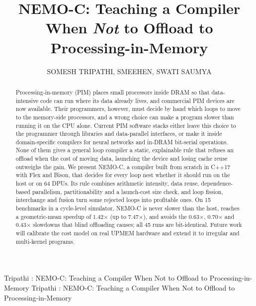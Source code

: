 \documentclass{ieeeaccess}
\begin{document}

\title{NEMO-C: Teaching a Compiler When \emph{Not} to Offload to Processing-in-Memory}

\author{\uppercase{Somesh Tripathi},
\uppercase{Smeehen},
\uppercase{Swati Saumya}}

\address[1]{School of Computer Science and Engineering, Vellore Institute of Technology, Vellore, Tamil Nadu 632014, India (Reg. Nos. 24BCE0533, 24BCE0502, 24BCE0253)}


\markboth
{Tripathi \headeretal: NEMO-C: Teaching a Compiler When Not to Offload to Processing-in-Memory}
{Tripathi \headeretal: NEMO-C: Teaching a Compiler When Not to Offload to Processing-in-Memory}


\begin{abstract}
Processing-in-memory (PIM) places small processors inside DRAM so that data-intensive code can run where its data already lives, and commercial PIM devices are now available. Their programmers, however, must decide by hand which loops to move to the memory-side processors, and a wrong choice can make a program slower than running it on the CPU alone. Current PIM software stacks either leave this choice to the programmer through libraries and data-parallel interfaces, or make it inside domain-specific compilers for neural networks and in-DRAM bit-serial operations. None of them gives a general loop compiler a static, explainable rule that refuses an offload when the cost of moving data, launching the device and losing cache reuse outweighs the gain. We present NEMO-C, a compiler built from scratch in C++17 with Flex and Bison, that decides for every loop nest whether it should run on the host or on 64 DPUs. Its rule combines arithmetic intensity, data reuse, dependence-based parallelism, partitionability and a launch-cost size check, and loop fission, interchange and fusion turn some rejected loops into profitable ones. On 15 benchmarks in a cycle-level simulator, NEMO-C is never slower than the host, reaches a geometric-mean speedup of 1.42$\times$ (up to 7.47$\times$), and avoids the 0.63$\times$, 0.70$\times$ and 0.43$\times$ slowdowns that blind offloading causes; all 45 runs are bit-identical. Future work will calibrate the cost model on real UPMEM hardware and extend it to irregular and multi-kernel programs.
\end{abstract}
\end{document}
